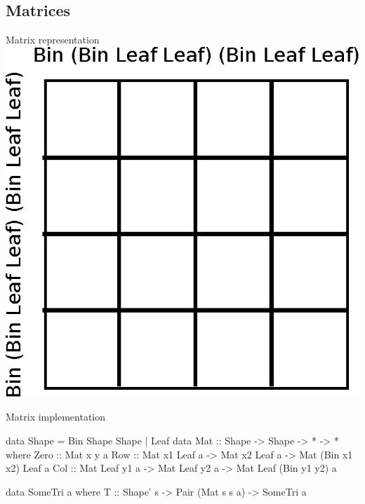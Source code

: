 \documentclass{beamer}
\begin{document}
\subsection{Matrices}
\begin{frame}{Matrix representation}
    \centering
    \includegraphics[width=.5\textwidth]{example-matrix-4x4.eps}
\end{frame}

\begin{frame}[fragile]{Matrix implementation}
\begin{code}
data Shape = Bin Shape Shape | Leaf
data Mat :: Shape -> Shape -> * -> * where
  Zero :: Mat x y a
  Row :: Mat x1 Leaf a -> Mat x2 Leaf a -> Mat (Bin x1 x2) Leaf a
  Col :: Mat Leaf y1 a -> Mat Leaf y2 a -> Mat Leaf (Bin y1 y2) a

data SomeTri a where
  T :: Shape' s -> Pair (Mat s s a) -> SomeTri a
\end{code}
\end{frame}
\end{document}
